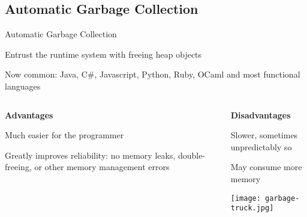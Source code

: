 \documentclass{plt}
\begin{document}
\subsection{Automatic Garbage Collection}

\begin{frame}{Automatic Garbage Collection}

Entrust the runtime system with freeing heap objects

Now common: Java, C\#, Javascript, Python, Ruby, OCaml and most
functional languages

\medskip

\begin{columns}[t]
\begin{column}{0.5\textwidth}
\baselineskip
\textbf{Advantages}

Much easier for the programmer

Greatly improves reliability: no memory leaks, double-freeing, or
other memory management errors
\end{column}
\begin{column}{0.5\textwidth}
\baselineskip
\textbf{Disadvantages}

Slower, sometimes unpredictably so

May consume more memory

\texttt{[image: garbage-truck.jpg]}

\end{column}
\end{columns}

\end{frame}
\end{document}

